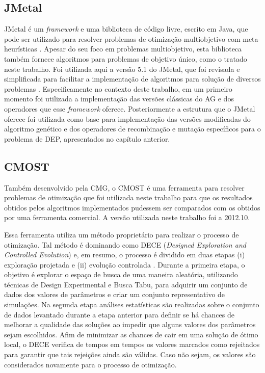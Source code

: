 \subsection{JMetal}
\label{sec:4_JMetal}
JMetal é um \textit{framework} e uma biblioteca de código livre, escrito em Java, que pode ser utilizado para resolver problemas de otimização multiobjetivo com meta-heurísticas \cite{Durillo2011}. Apesar do seu foco em problemas multiobjetivo, esta biblioteca também fornece algoritmos para problemas de objetivo único, como o tratado neste trabalho. Foi utilizada aqui a versão 5.1 do JMetal, que foi revisada e simplificada para facilitar a implementação de algoritmos para solução de diversos problemas \cite{Nebro2015}. Especificamente no contexto deste trabalho, em um primeiro momento foi utilizada a implementação das versões clássicas do AG e dos operadores que esse \textit{framework} oferece. Posteriormente a estrutura que o JMetal oferece foi utilizada como base para implementação das versões modificadas do algoritmo genético e dos operadores de recombinação e mutação específicos para o problema de DEP, apresentados no capítulo anterior. 

\subsection{CMOST}
\label{sec:4_CMOST}
Também desenvolvido pela CMG, o CMOST é uma ferramenta para resolver problemas de otimização que foi utilizada neste trabalho para que os resultados obtidos pelos algoritmos implementados pudessem ser comparados com os obtidos por uma ferramenta comercial. A versão utilizada neste trabalho foi a 2012.10.

Essa ferramenta utiliza um método proprietário para realizar o processo de otimização. Tal método é dominando como DECE (\textit{Designed Exploration and Controlled Evolution}) e, em resumo, o processo é dividido em duas etapas (i) exploração projetada e (ii) evolução controlada \cite{CMG2012}. Durante a primeira etapa, o objetivo é explorar o espaço de busca de uma maneira aleatória, utilizando técnicas de Design Experimental e Busca Tabu, para adquirir um conjunto de dados dos valores de parâmetros e criar um conjunto representativo de simulações. Na segunda etapa análises estatísticas são realizadas sobre o conjunto de dados levantado durante a etapa anterior para definir se há chances de melhorar a qualidade das soluções ao impedir que alguns valores dos parâmetros sejam escolhidos. Afim de minimizar as chances de cair em uma solução de ótimo local, o DECE verifica de tempos em tempos os valores marcados como rejeitados para garantir que tais rejeições ainda são válidas. Caso não sejam, os valores são considerados novamente para o processo de otimização.

